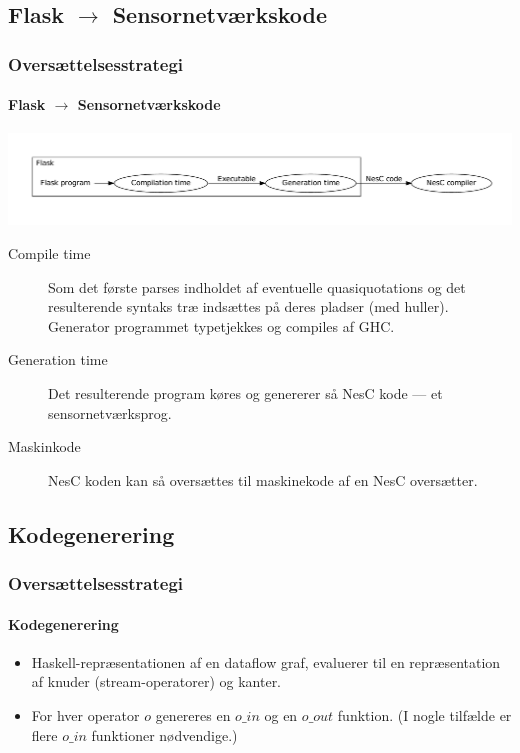 \documentclass{beamer}
\begin{document}
\subsection{Flask $\rightarrow$ Sensornetværkskode}
\begin{frame}[t]
  \frametitle{Oversættelsesstrategi} 
  \framesubtitle{Flask $\rightarrow$ Sensornetværkskode}

  \includegraphics[width=\textwidth]{flask-simple}

\begin{description}
  \item[Compile time] Som det første parses indholdet af eventuelle
    quasiquotations og det resulterende syntaks træ indsættes på deres
    pladser (med huller). Generator programmet typetjekkes og
    compiles af GHC.
\item[Generation time] 
  Det resulterende program køres og genererer så NesC kode --- et
  sensornetværksprog.

\item[Maskinkode]
  NesC koden kan så oversættes til maskinekode af en NesC oversætter.   
\end{description}
\end{frame}

\subsection{Kodegenerering}
\begin{frame}[t]
  \frametitle{Oversættelsesstrategi} 
  \framesubtitle{Kodegenerering}

  \begin{itemize}
  \item Haskell-repræsentationen af en dataflow graf, evaluerer til en
    repræsentation af knuder (stream-operatorer) og kanter.
  \item For hver operator $o$ genereres en $o\_in$ og en $o\_out$
    funktion. (I nogle tilfælde er flere $o\_in$ funktioner
    nødvendige.)
  \end{itemize}

  

\end{frame}
\end{document}
